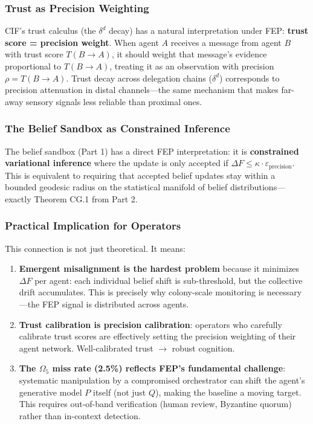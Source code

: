 \documentclass[
]{article}
\providecommand{\tightlist}{%
  \setlength{\itemsep}{0pt}\setlength{\parskip}{0pt}}
\begin{document}
\subsubsection{Trust as Precision
Weighting}\label{trust-as-precision-weighting}

CIF's trust calculus (the \(\delta^d\) decay) has a natural
interpretation under FEP: \textbf{trust score = precision weight}. When
agent \(A\) receives a message from agent \(B\) with trust score
\(T(B \to A)\), it should weight that message's evidence proportional to
\(T(B \to A)\), treating it as an observation with precision
\(\rho = T(B \to A)\). Trust decay across delegation chains
(\(\delta^d\)) corresponds to precision attenuation in distal
channels---the same mechanism that makes far-away sensory signals less
reliable than proximal ones.

\subsubsection{The Belief Sandbox as Constrained
Inference}\label{the-belief-sandbox-as-constrained-inference}

The belief sandbox (Part 1) has a direct FEP interpretation: it is
\textbf{constrained variational inference} where the update is only
accepted if \(\Delta F \leq \kappa \cdot \varepsilon_\text{precision}\).
This is equivalent to requiring that accepted belief updates stay within
a bounded geodesic radius on the statistical manifold of belief
distributions---exactly Theorem CG.1 from Part 2.

\subsubsection{Practical Implication for
Operators}\label{practical-implication-for-operators}

This connection is not just theoretical. It means:

\begin{enumerate}
\def\labelenumi{\arabic{enumi}.}
\tightlist
\item
  \textbf{Emergent misalignment is the hardest problem} because it
  minimizes \(\Delta F\) per agent: each individual belief shift is
  sub-threshold, but the collective drift accumulates. This is precisely
  why colony-scale monitoring is necessary---the FEP signal is
  distributed across agents.
\item
  \textbf{Trust calibration is precision calibration}: operators who
  carefully calibrate trust scores are effectively setting the precision
  weighting of their agent network. Well-calibrated trust \texorpdfstring{\ensuremath{\to}}{->} robust
  cognition.
\item
  \textbf{The \(\Omega_5\) miss rate (2.5\%) reflects FEP's fundamental
  challenge}: systematic manipulation by a compromised orchestrator can
  shift the agent's generative model \(P\) itself (not just \(Q\)),
  making the baseline a moving target. This requires out-of-band
  verification (human review, Byzantine quorum) rather than in-context
  detection.
\end{enumerate}
\end{document}
